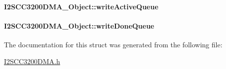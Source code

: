 \paragraph[{write\+Active\+Queue}]{ I2\+S\+C\+C3200\+D\+M\+A\+\_\+\+Object\+::write\+Active\+Queue}\label{struct_i2_s_c_c3200_d_m_a___object_a82ca68cd962045ee65cfdc412e9e75cd}
\paragraph[{write\+Done\+Queue}]{ I2\+S\+C\+C3200\+D\+M\+A\+\_\+\+Object\+::write\+Done\+Queue}\label{struct_i2_s_c_c3200_d_m_a___object_a13ac8bba9aa2e279efbf520be0ec9fab}


The documentation for this struct was generated from the following file\+:\begin{DoxyCompactItemize}
\item 
\hyperlink{_i2_s_c_c3200_d_m_a_8h}{I2\+S\+C\+C3200\+D\+M\+A.\+h}\end{DoxyCompactItemize}
